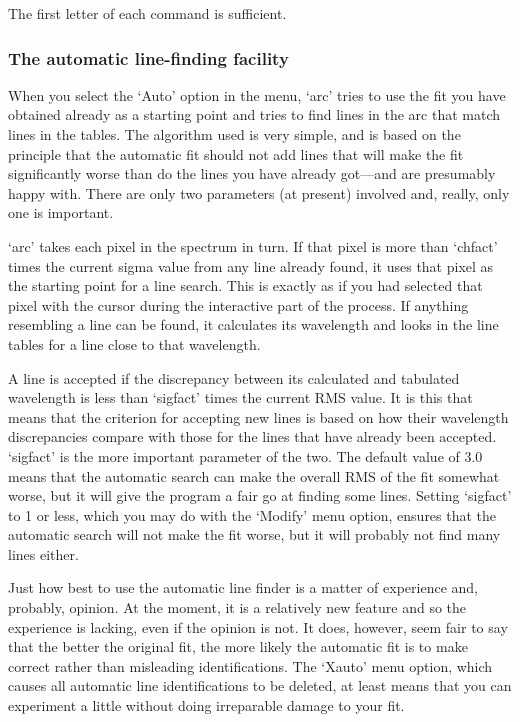 \documentclass[11pt,twoside]{article}
\newcommand{\latorhtm}[2]{#1}
\newcommand{\latorhtm}[2]{#2}
\begin{document}
The first letter of each command is sufficient.


\subsubsection{\label{techno10auto}The automatic line-finding facility}

   When you select the `Auto' option in the menu, `arc' tries to use the
   fit you have obtained already as a starting point and tries to find
   lines in the arc that match lines in the tables. The algorithm used
   is very simple, and is based on the principle that the automatic fit
   should not add lines that will make the fit significantly worse than
   do the lines you have already got\latorhtm{---}{-}and are presumably
   happy with.
   There are only two parameters (at present) involved and, really, only
   one is important.

   `arc' takes each pixel in the spectrum in turn.  If that pixel is
   more than `chfact' times the current sigma value from any line
   already found,  it uses  that pixel as the starting point for a line
   search.  This is exactly as if you had selected that pixel with the
   cursor during the interactive part of the process.  If anything
   resembling a line can be found, it calculates its wavelength and
   looks in the line tables for a line close to that wavelength.

   A line is accepted if the discrepancy between its calculated and
   tabulated wavelength is less than `sigfact' times the current RMS
   value.  It is this that means that the criterion for accepting new
   lines is based on how their wavelength discrepancies compare with
   those for the lines that have already been accepted.  `sigfact' is
   the more important parameter of the two.  The default value of 3.0
   means that the automatic search can make the overall RMS of the fit
   somewhat worse, but it will give the program a fair go at finding
   some lines.  Setting `sigfact' to 1 or less, which you may do with
   the `Modify' menu option, ensures that the automatic search will not
   make the fit worse, but it will probably not find many lines either.

   Just how best to use the automatic line finder is a matter of
   experience and, probably, opinion.  At the moment, it is a relatively
   new feature and so the experience is lacking, even if the opinion is
   not. It does, however, seem fair to say that the better the original
   fit, the more likely the automatic fit is to make correct rather than
   misleading identifications.  The `Xauto' menu option, which causes
   all automatic line identifications to be deleted, at least means that
   you can experiment a little without doing irreparable damage to your
   fit.
\end{document}
